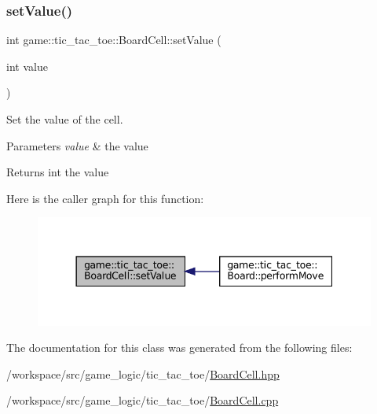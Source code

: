 \subsubsection{\texorpdfstring{set\+Value()}{setValue()}}
{\footnotesize\ttfamily int game\+::tic\+\_\+tac\+\_\+toe\+::\+Board\+Cell\+::set\+Value (\begin{DoxyParamCaption}\item[{int}]{value }\end{DoxyParamCaption})}



Set the value of the cell. 


\begin{DoxyParams}{Parameters}
{\em value} & the value \\
\hline
\end{DoxyParams}
\begin{DoxyReturn}{Returns}
int the value 
\end{DoxyReturn}
Here is the caller graph for this function\+:
\nopagebreak
\begin{figure}[H]
\begin{center}
\leavevmode
\includegraphics[width=344pt]{classgame_1_1tic__tac__toe_1_1_board_cell_a3ee72b5b70a0d0eb8abbe4cdcdf4038d_icgraph}
\end{center}
\end{figure}


The documentation for this class was generated from the following files\+:\begin{DoxyCompactItemize}
\item 
/workspace/src/game\+\_\+logic/tic\+\_\+tac\+\_\+toe/\hyperlink{tic__tac__toe_2_board_cell_8hpp}{Board\+Cell.\+hpp}\item 
/workspace/src/game\+\_\+logic/tic\+\_\+tac\+\_\+toe/\hyperlink{tic__tac__toe_2_board_cell_8cpp}{Board\+Cell.\+cpp}\end{DoxyCompactItemize}
